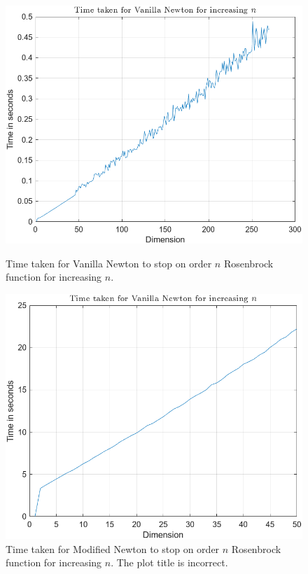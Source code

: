 \begin{figure}[!htb]
  \centering
  \begin{minipage}{0.45\textwidth}
    \centering
    \includegraphics[width=\linewidth]{Images/VN_time.png}
    \caption{Time taken for Vanilla Newton to stop on order $n$ Rosenbrock function for increasing $n$.}
    \label{fig:VNTime}
  \end{minipage}\hfill
  \begin{minipage}{0.45\textwidth}
    \centering
    \includegraphics[width=\linewidth]{Images/NMHM_time.png}
    \caption{Time taken for Modified Newton to stop on order $n$ Rosenbrock function for increasing $n$. The plot title is incorrect.}
    \label{fig:NMHMTime}
  \end{minipage}
\end{figure}
